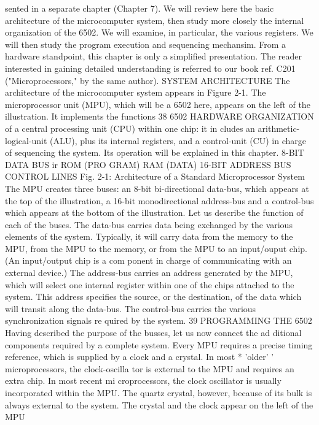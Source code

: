 \documentclass{book}
\begin{document}
sented in a separate chapter (Chapter 7).
We will review here the basic architecture of the microcomputer
system, then study more closely the internal organization of the
6502. We will examine, in particular, the various registers. We will
then study the program execution and sequencing mechansim.
From a hardware standpoint, this chapter is only a simplified
presentation. The reader interested in gaining detailed understanding
is referred to our book ref. C201 ("Microprocessors," by the same
author).
SYSTEM ARCHITECTURE
The architecture of the microcomputer system appears in Figure
2-1. The microprocessor unit (MPU), which will be a 6502 here,
appears on the left of the illustration. It implements the functions
38
6502 HARDWARE ORGANIZATION
of a central processing unit (CPU) within one chip: it in
cludes an arithmetic-logical-unit (ALU), plus its internal registers,
and a control-unit (CU) in charge of sequencing the system.
Its operation will be explained in this chapter.
8-BIT DATA BUS
ir
ROM
(PRO
GRAM)
RAM
(DATA)
16-BIT ADDRESS BUS
CONTROL LINES
Fig. 2-1: Architecture of a Standard Microprocessor System
The MPU creates three buses: an 8-bit bi-directional data-bus,
which appears at the top of the illustration, a 16-bit monodirectional
address-bus and a control-bus which appears at the
bottom of the illustration. Let us describe the function of each of
the buses.
The data-bus carries data being exchanged by the various
elements of the system. Typically, it will carry data from the
memory to the MPU, from the MPU to the memory, or from
the MPU to an input/ouput chip. (An input/output chip is a com
ponent in charge of communicating with an external device.)
The address-bus carries an address generated by the MPU,
which will select one internal register within one of the chips
attached to the system. This address specifies the source, or the
destination, of the data which will transit along the data-bus.
The control-bus carries the various synchronization signals re
quired by the system.
39
PROGRAMMING THE 6502
Having described the purpose of the busses, let us now connect the ad
ditional components required by a complete system.
Every MPU requires a precise timing reference, which is supplied by a
clock and a crystal. In most * 'older' ' microprocessors, the clock-oscilla
tor is external to the MPU and requires an extra chip. In most recent mi
croprocessors, the clock oscillator is usually incorporated within the
MPU. The quartz crystal, however, because of its bulk is always external
to the system. The crystal and the clock appear on the left of the MPU
\end{document}
